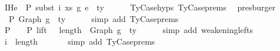 \begin{isabellebody}
\ IHe{}{\isacharcolon}{\kern0pt}\ {\isachardoublequoteopen}{\isasymGamma}{}\ {\isasymturnstile}{\isacharbraceleft}{\kern0pt}P{\isacharbraceright}{\kern0pt}\ subst\ i\ xs\ g{}\ e{}\ {\isacharcolon}{\kern0pt}\ ty{}{\isacharprime}{\kern0pt}{\isachardoublequoteclose}\isanewline
\ \ \ \ \isamarkupfalse%
\ TyCase{\isachardot}{\kern0pt}hyps{\isacharparenleft}{\kern0pt}{}{\isacharparenright}{\kern0pt}\ TyCase{\isachardot}{\kern0pt}prems{\isacharparenleft}{\kern0pt}{}{\isacharcomma}{\kern0pt}{}{\isacharcomma}{\kern0pt}{}{\isacharcomma}{\kern0pt}{}{\isacharcomma}{\kern0pt}{}{\isacharparenright}{\kern0pt}\ \isamarkupfalse%
\ presburger\isanewline
\isanewline
\ \ \isamarkupfalse%
\ {\isachardoublequoteopen}{\isasymGamma}{}\ {\isasymturnstile}{\isacharbraceleft}{\kern0pt}P{\isacharbraceright}{\kern0pt}\ Graph\ g{}\ {\isacharcolon}{\kern0pt}\ ty{}{\isachardoublequoteclose}\isanewline
\ \ \ \ \isamarkupfalse%
\ {\isacharparenleft}{\kern0pt}simp\ add{\isacharcolon}{\kern0pt}\ TyCase{\isachardot}{\kern0pt}prems{\isacharparenleft}{\kern0pt}{}{\isacharparenright}{\kern0pt}{\isacharparenright}{\kern0pt}\isanewline
\ \ \isamarkupfalse%
\ \isamarkupfalse%
\ P{}{\isacharcolon}{\kern0pt}\ {\isachardoublequoteopen}{\isasymGamma}{}{\isacharprime}{\kern0pt}\ {\isacharat}{\kern0pt}\ {\isasymGamma}{}\ {\isasymturnstile}{\isacharbraceleft}{\kern0pt}P{\isacharbraceright}{\kern0pt}\ {\isacharparenleft}{\kern0pt}lift\ {}\ {\isacharcircum}{\kern0pt}{\isacharcircum}{\kern0pt}\ length\ {\isasymGamma}{}{\isacharprime}{\kern0pt}{\isacharparenright}{\kern0pt}\ {\isacharparenleft}{\kern0pt}Graph\ g{}{\isacharparenright}{\kern0pt}\ {\isacharcolon}{\kern0pt}\ ty{}{\isachardoublequoteclose}\isanewline
\ \ \ \ \isamarkupfalse%
\ {\isacharparenleft}{\kern0pt}simp\ add{\isacharcolon}{\kern0pt}\ weakening{\isacharunderscore}{\kern0pt}lefts{\isacharparenright}{\kern0pt}\isanewline
\isanewline
\ \ \isamarkupfalse%
\ {\isachardoublequoteopen}i\ {\isasymle}\ length\ {\isasymGamma}{}{\isachardoublequoteclose}\isanewline
\ \ \ \ \isamarkupfalse%
\ {\isacharparenleft}{\kern0pt}simp\ add{\isacharcolon}{\kern0pt}\ TyCase{\isachardot}{\kern0pt}prems{\isacharparenleft}{\kern0pt}{}{\isacharparenright}{\kern0pt}{\isacharparenright}{\kern0pt}\isanewline

\end{isabellebody}
